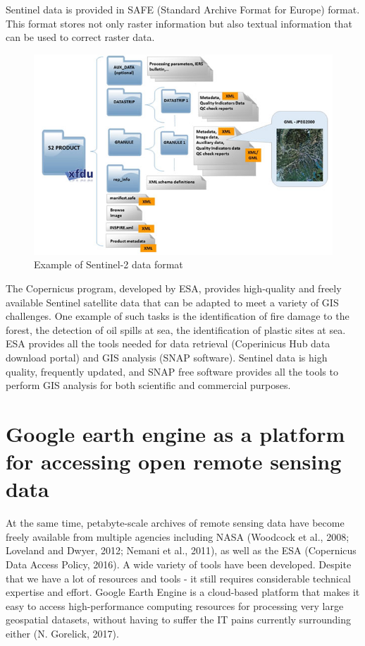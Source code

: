 	Sentinel data is provided in SAFE (Standard Archive Format for Europe) format. This format stores not only raster information but also textual information that can be used to correct raster data.

\begin{figure}[H]
	\centering
	\includegraphics[width=0.8\linewidth]{images/sentinel-2_data_formats.jpg}
	\caption{Example of Sentinel-2 data format}
	\label{fig:sentinel-2_format}
\end{figure}

	The Copernicus program, developed by ESA, provides high-quality and freely available Sentinel satellite data that can be adapted to meet a variety of GIS challenges. One example of such tasks is the identification of fire damage to the forest, the detection of oil spills at sea, the identification of plastic sites at sea. ESA provides all the tools needed for data retrieval (Coperinicus Hub data download portal) and GIS analysis (SNAP software). Sentinel data is high quality, frequently updated, and SNAP free software provides all the tools to perform GIS analysis for both scientific and commercial purposes.

\section{Google earth engine as a platform for accessing open remote sensing data}
	At the same time, petabyte-scale archives of remote sensing data have become freely available from multiple agencies including NASA (Woodcock et al., 2008; Loveland and Dwyer, 2012; Nemani et al., 2011), as well as the ESA (Copernicus Data Access Policy, 2016). A wide variety of tools have been developed. Despite that we have a lot of resources and tools - it still requires considerable technical expertise and effort. Google Earth Engine is a cloud-based platform that makes it easy to access high-performance computing resources for processing very large geospatial datasets, without having to suffer the IT pains currently surrounding either (N. Gorelick, 2017).

